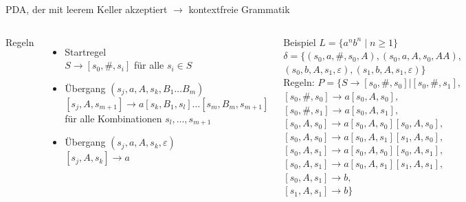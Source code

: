
\begin{frame}{PDA, der mit leerem Keller akzeptiert $\rightarrow$ kontextfreie Grammatik}
	\label{Grammatik_aus_PDA}
	\begin{columns}
		Regeln
		\begin{itemize}
			\item Startregel\\
			$S\rightarrow [s_0, \#, s_i]$ für alle $s_i \in S$
			\item Übergang $(s_j,a,A,s_k,B_1\ldots B_m)$\\
			$[s_j,A,s_{m+1}] \rightarrow a[s_k,B_1,s_l]\ldots[s_m,B_m,s_{m+1}]$ für alle Kombinationen $s_l,\ldots,s_{m+1}$
			\item Übergang $(s_j,a,A,s_k,\varepsilon)$\\
			$[s_j,A,s_k]\rightarrow a$
		\end{itemize}
		Beispiel $L=\{a^nb^n \mid n \geq 1\}$\\
		 $\delta=\{(s_0,a,\#,s_0,A),(s_0,a,A,s_0,AA),$\\
		 \qquad$(s_0,b,A,s_1,\varepsilon),(s_1,b,A,s_1,\varepsilon)\}$\\
		 \vspace{0.5em}
		Regeln: $P=\{S \rightarrow [s_0,\#,s_0]|[s_0,\#,s_1],$\\
			$[s_0,\#,s_0]\rightarrow a[s_0,A,s_0],$\\
			$[s_0,\#,s_1]\rightarrow a[s_0,A,s_1],$\\
			$[s_0,A,s_0]\rightarrow a[s_0,A,s_0][s_0,A,s_0],$\\
			$[s_0,A,s_0]\rightarrow a[s_0,A,s_1][s_1,A,s_0],$\\
			$[s_0,A,s_1]\rightarrow a[s_0,A,s_0][s_0,A,s_1],$\\
			$[s_0,A,s_1]\rightarrow a[s_0,A,s_1][s_1,A,s_1],$\\
			$[s_0,A,s_1]\rightarrow b,$\\ $[s_1,A,s_1]\rightarrow b\}$
	\end{columns}
\end{frame}

